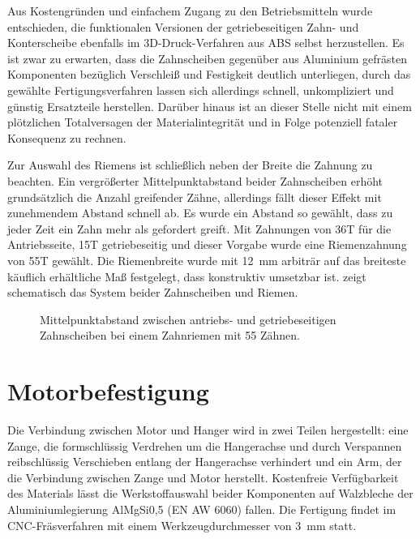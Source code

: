 		Aus Kostengründen und einfachem Zugang zu den Betriebsmitteln wurde entschieden, die funktionalen Versionen der getriebeseitigen Zahn- und Konterscheibe ebenfalls im 3D-Druck-Verfahren aus ABS selbst herzustellen.
		Es ist zwar zu erwarten, dass die Zahnscheiben gegenüber aus Aluminium gefrästen Komponenten bezüglich Verschleiß und Festigkeit deutlich unterliegen, durch das gewählte Fertigungsverfahren lassen sich allerdings schnell, unkompliziert und günstig Ersatzteile herstellen.
		Darüber hinaus ist an dieser Stelle nicht mit einem plötzlichen Totalversagen der Materialintegrität und in Folge potenziell fataler Konsequenz zu rechnen.\par\medskip
		Zur Auswahl des Riemens ist schließlich neben der Breite die Zahnung zu beachten.
		Ein vergrößerter Mittelpunktabstand beider Zahnscheiben erhöht grundsätzlich die Anzahl greifender Zähne, allerdings fällt dieser Effekt mit zunehmendem Abstand schnell ab.
		Es wurde ein Abstand so gewählt, dass zu jeder Zeit ein Zahn mehr als gefordert greift.
		Mit Zahnungen von 36T für die Antriebsseite, 15T getriebeseitig und dieser Vorgabe wurde eine Riemenzahnung von 55T gewählt.
		Die Riemenbreite wurde mit \qty{12}{\milli\metre} arbiträr auf das breiteste käuflich erhältliche Maß festgelegt, dass konstruktiv umsetzbar ist.
		 zeigt schematisch das System beider Zahnscheiben und Riemen.
		\begin{figure}[h]
			\centering
			
			\caption[Mittelpunktabstand zwischen antriebs- und getriebeseitigen Zahnscheiben]{Mittelpunktabstand zwischen antriebs- und getriebeseitigen Zahnscheiben bei einem Zahnriemen mit 55 Zähnen.}%
			\label{fig:timing belt length}
		\end{figure}
	\section{Motorbefestigung}\label{sec:motorbefestigung}
		Die Verbindung zwischen Motor und Hanger wird in zwei Teilen hergestellt: eine Zange, die formschlüssig Verdrehen um die Hangerachse und durch Verspannen reibschlüssig Verschieben entlang der Hangerachse verhindert und ein Arm, der die Verbindung zwischen Zange und Motor herstellt.
		Kostenfreie Verfügbarkeit des Materials lässt die Werkstoffauswahl beider Komponenten auf Walzbleche der Aluminiumlegierung AlMgSi0,5 (EN AW 6060) fallen.
		Die Fertigung findet im CNC-Fräsverfahren mit einem Werkzeugdurchmesser von \qty{3}{\milli\metre} statt.

